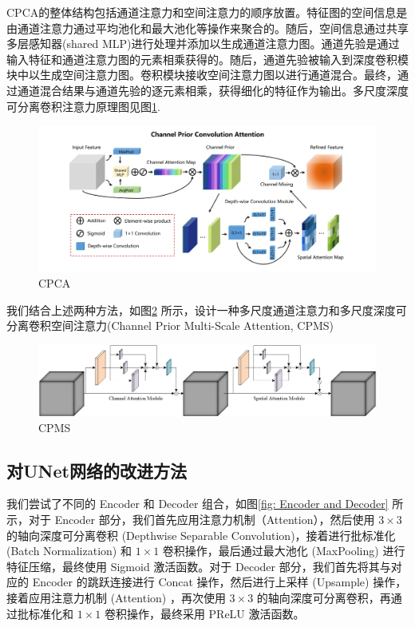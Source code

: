 \documentclass[a4paper]{ctexart}
\begin{document}
	CPCA的整体结构包括通道注意力和空间注意力的顺序放置。特征图的空间信息是由通道注意力通过平均池化和最大池化等操作来聚合的。随后，空间信息通过共享多层感知器(shared MLP)进行处理并添加以生成通道注意力图。通道先验是通过输入特征和通道注意力图的元素相乘获得的。随后，通道先验被输入到深度卷积模块中以生成空间注意力图。卷积模块接收空间注意力图以进行通道混合。最终，通过通道混合结果与通道先验的逐元素相乘，获得细化的特征作为输出。多尺度深度可分离卷积注意力原理图见图\ref{fig: CPCA}.
	
	\begin{figure}[htbp]
		\centering
		\includegraphics[width=0.8\linewidth]{picture/LLIE/Experiment/Attention/CPCA}
		\caption{CPCA}
		\label{fig: CPCA}
	\end{figure}
	
	我们结合上述两种方法，如图\ref{fig: CPMS} 所示，设计一种多尺度通道注意力和多尺度深度可分离卷积空间注意力(Channel Prior Multi-Scale Attention, CPMS)
	
	\begin{figure}[htbp]
		\centering
		\includegraphics[width=0.8\linewidth]{picture/LLIE/Experiment/Attention/CPMS}
		\caption{CPMS}
		\label{fig: CPMS}
	\end{figure}
	
	
	\subsection*{对UNet网络的改进方法}
	
	我们尝试了不同的 Encoder 和 Decoder 组合，如图\ref{fig: Encoder and Decoder} 所示，对于 Encoder 部分，我们首先应用注意力机制（Attention），然后使用 $3 \times 3$ 的轴向深度可分离卷积 (Depthwise Separable Convolution)，接着进行批标准化 (Batch Normalization) 和 $1 \times 1$ 卷积操作，最后通过最大池化 (MaxPooling) 进行特征压缩，最终使用 Sigmoid 激活函数。对于 Decoder 部分，我们首先将其与对应的 Encoder 的跳跃连接进行 Concat 操作，然后进行上采样 (Upsample) 操作，接着应用注意力机制 (Attention) ，再次使用 $3 \times 3$ 的轴向深度可分离卷积，再通过批标准化和 $1 \times 1$ 卷积操作，最终采用 PReLU 激活函数。
	
\end{document}
